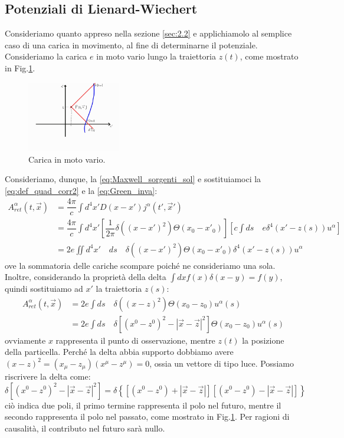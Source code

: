 \subsection{Potenziali di Lienard-Wiechert}
Consideriamo quanto appreso nella sezione \ref{sec:2.2} e applichiamolo al semplice caso di una carica in movimento, al fine di determinarne il potenziale.
Consideriamo la carica $e$ in moto vario lungo la traiettoria $z(t)$, come mostrato in Fig.\ref{fig:Carica}.
\begin{figure}[H]
    \centering
    \includegraphics[width=0.36\textwidth]{Immagini/L-W.jpg}
    \caption{Carica in moto vario.}
    \label{fig:Carica}
\end{figure}
Consideriamo, dunque, la \eqref{eq:Maxwell_sorgenti_sol} e sostituiamoci la \eqref{eq:def_quad_corr2} e la \eqref{eq:Green_inva}:
\begin{equation}
\begin{aligned}
     A_{ret}^\alpha(t,\Vec{x})&=\dfrac{4\pi}{c}\int d^4x'D(x-x')j^\alpha(t',\Vec{x}')\\
     &=\dfrac{4\pi}{c}\int d^4x'[\dfrac{1}{2\pi}\delta\left((x-x')^2\right)\Theta(x_0-x'_0)][c\int ds \quad e\delta^4\left(x'-z(s)\right)u^\alpha]\\
     &=2e\iint  d^4x'\quad ds\quad \delta\left((x-x')^2\right)\Theta(x_0-x'_0)\delta^4\left(x'-z(s)\right)u^\alpha
\end{aligned}
\end{equation}
ove la sommatoria delle cariche scompare poiché ne consideriamo una sola. Inoltre, considerando la proprietà della delta $\int dx f(x)\delta(x-y)=f(y)$, quindi sostituiamo ad $x'$ la traiettoria $z(s)$:
\begin{equation}
\begin{aligned}
     A_{ret}^\alpha(t,\Vec{x})&=2e\int ds\quad \delta\left((x-z)^2\right)\Theta(x_0-z_0)u^\alpha(s)\\
     &=2e\int ds\quad \delta\left[(x^0-z^0)^2-|\Vec{x}-\Vec{z}|^2\right]\Theta(x_0-z_0)u^\alpha(s)
\end{aligned}
\end{equation}
ovviamente $x$ rappresenta il punto di osservazione, mentre $z(t)$ la posizione della particella. Perché la delta abbia supporto dobbiamo avere $(x-z)^2=(x_\mu-z_\mu)(x^\mu-z^\mu)=0$, ossia un vettore di tipo luce. Possiamo riscrivere la delta come:
\begin{equation}
     \delta\left[(x^0-z^0)^2-|\Vec{x}-\Vec{z}|^2\right]= \delta\left\{[(x^0-z^0)+|\Vec{x}-\Vec{z}|][(x^0-z^0)-|\Vec{x}-\Vec{z}|]\right\}
\end{equation}
ciò indica due poli, il primo termine rappresenta il polo nel futuro, mentre il secondo rappresenta il polo nel passato, come mostrato in Fig.\ref{fig:Carica}. Per ragioni di causalità, il contributo nel futuro sarà nullo.

